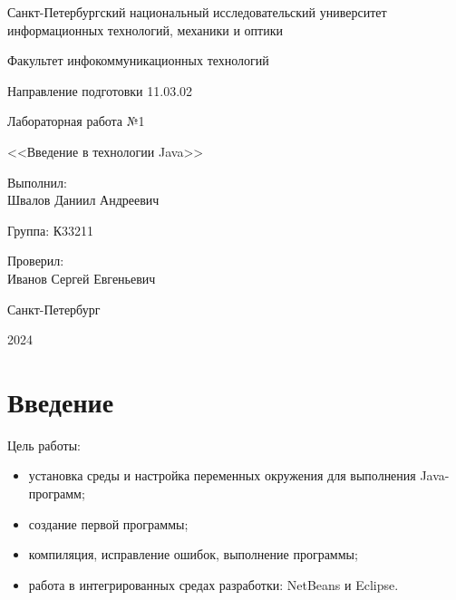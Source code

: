 \documentclass[a4paper, 14pt]{extarticle}
\begin{document}
\begin{titlepage}
  \vspace{0pt plus2fill}
  \noindent

  \vspace{0pt plus6fill}
  \begin{center}
    Санкт-Петербургский национальный исследовательский университет
    информационных технологий, механики и оптики

    \vspace{0pt plus3fill}

    Факультет инфокоммуникационных технологий

    Направление подготовки 11.03.02

    \vspace{0pt plus2fill}

    Лабораторная работа №1

    <<Введение в технологии Java>>

  \end{center}

  \vspace{0pt plus6fill}
  \begin{flushright}
    Выполнил: \\
    Швалов Даниил Андреевич

    Группа: К33211

    Проверил: \\
    Иванов Сергей Евгеньевич
  \end{flushright}

  \vspace{0pt plus5fill}
  \begin{center}
    Санкт-Петербург

    2024
  \end{center}
\end{titlepage}

\setcounter{page}{2}

\section*{Введение}

Цель работы:
\begin{itemize}
  \item установка среды и настройка переменных окружения для выполнения Java-
  программ;
  \item создание первой программы;
  \item компиляция, исправление ошибок, выполнение программы;
  \item работа в интегрированных средах разработки: NetBeans и Eclipse.
\end{itemize}
\end{document}
